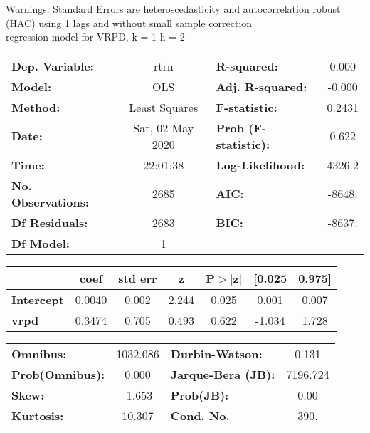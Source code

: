 Warnings: \newline
 [1] Standard Errors are heteroscedasticity and autocorrelation robust (HAC) using 1 lags and without small sample correction\\ 

regression model for VRPD, k = 1 h = 2\begin{center}
\begin{tabular}{lclc}
\toprule
\textbf{Dep. Variable:}    &       rtrn       & \textbf{  R-squared:         } &     0.000   \\
\textbf{Model:}            &       OLS        & \textbf{  Adj. R-squared:    } &    -0.000   \\
\textbf{Method:}           &  Least Squares   & \textbf{  F-statistic:       } &    0.2431   \\
\textbf{Date:}             & Sat, 02 May 2020 & \textbf{  Prob (F-statistic):} &    0.622    \\
\textbf{Time:}             &     22:01:38     & \textbf{  Log-Likelihood:    } &    4326.2   \\
\textbf{No. Observations:} &        2685      & \textbf{  AIC:               } &    -8648.   \\
\textbf{Df Residuals:}     &        2683      & \textbf{  BIC:               } &    -8637.   \\
\textbf{Df Model:}         &           1      & \textbf{                     } &             \\
\bottomrule
\end{tabular}
\begin{tabular}{lcccccc}
                   & \textbf{coef} & \textbf{std err} & \textbf{z} & \textbf{P$> |$z$|$} & \textbf{[0.025} & \textbf{0.975]}  \\
\midrule
\textbf{Intercept} &       0.0040  &        0.002     &     2.244  &         0.025        &        0.001    &        0.007     \\
\textbf{vrpd}      &       0.3474  &        0.705     &     0.493  &         0.622        &       -1.034    &        1.728     \\
\bottomrule
\end{tabular}
\begin{tabular}{lclc}
\textbf{Omnibus:}       & 1032.086 & \textbf{  Durbin-Watson:     } &    0.131  \\
\textbf{Prob(Omnibus):} &   0.000  & \textbf{  Jarque-Bera (JB):  } & 7196.724  \\
\textbf{Skew:}          &  -1.653  & \textbf{  Prob(JB):          } &     0.00  \\
\textbf{Kurtosis:}      &  10.307  & \textbf{  Cond. No.          } &     390.  \\
\bottomrule
\end{tabular}
\end{center}

